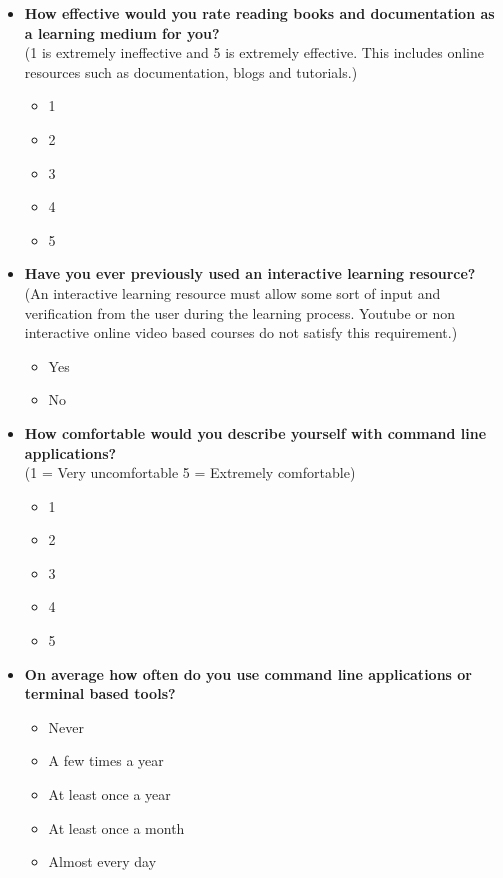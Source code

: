 \begin{itemize}
	\item  \textbf{How effective would you rate reading books and documentation as a learning medium for you? } \\(1 is extremely ineffective and 5 is extremely effective. This includes online resources such as documentation, blogs and tutorials.)
	      \begin{itemize}
		      \item  1
		      \item 2
		      \item 3
		      \item 4
		      \item 5
	      \end{itemize}
	\item  \textbf{Have you ever previously used an interactive learning resource?} \\(An interactive learning resource must allow some sort of input and verification from the user during the learning process. Youtube or non interactive online video based courses do not satisfy this requirement.)
	      \begin{itemize}
		      \item  Yes
		      \item No
	      \end{itemize}
	\item  \textbf{How  comfortable would you describe yourself with command line applications?} \\(1 = Very uncomfortable 5 = Extremely comfortable)
	      \begin{itemize}
		      \item  1
		      \item 2
		      \item 3
		      \item 4
		      \item 5
	      \end{itemize}

	\item  \textbf{On average how often do you use command line applications or terminal based tools?}
	      \begin{itemize}
		      \item Never
		      \item A few times a year
		      \item At least once a year
		      \item At least once a month
		      \item Almost every day
	      \end{itemize}


\end{itemize}
